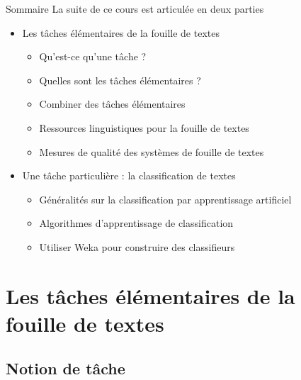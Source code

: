 \documentclass[hyperref={unicode}, xcolor={svgnames}, french]{beamer}
\begin{document}
\begin{frame}{Sommaire}
    La suite de ce cours est articulée en deux parties
    \begin{itemize}
        \item Les \alert{tâches élémentaires} de la fouille de textes
             \begin{itemize}
                 \item Qu'est-ce qu'une tâche ?
                 \item Quelles sont les tâches élémentaires ?
                 \item Combiner des tâches élémentaires
                 \item Ressources linguistiques pour la fouille de textes
                 \item Mesures de qualité des systèmes de fouille de textes
             \end{itemize}
        \item Une tâche particulière : la \alert{classification} de textes
            \begin{itemize}
                \item Généralités sur la classification par apprentissage artificiel
                \item Algorithmes d'apprentissage de classification
                \item Utiliser Weka pour construire des classifieurs
            \end{itemize}
    \end{itemize}
\end{frame}


\section{Les tâches élémentaires de la fouille de textes}

\subsection{Notion de tâche}
\end{document}
